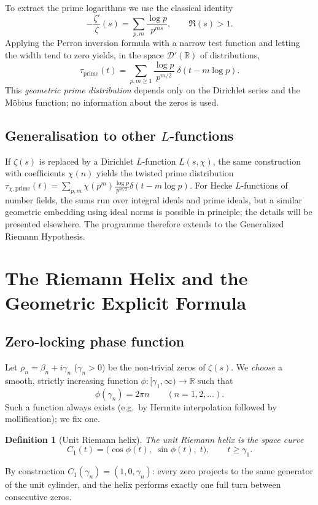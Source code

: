 \documentclass[11pt,a4paper]{article}
\newtheorem{definition}[theorem]{Definition}
\newcommand{\R}{\mathbb{R}}
\newcommand{\dist}{\mathcal{D}'}
\begin{document}
To extract the prime logarithms we use the classical identity
\[
-\frac{\zeta'}{\zeta}(s) = \sum_{p,m} \frac{\log p}{p^{m s}}, \qquad \Re(s)>1 .
\]
Applying the Perron inversion formula with a narrow test function and letting the width tend to zero yields, in the space \(\dist(\R)\) of distributions,
\begin{equation}\label{prime_dist}
\tau_{\text{prime}}(t) = \sum_{p,m\ge 1} \frac{\log p}{p^{m/2}} \;\delta(t - m\log p).
\end{equation}
This \emph{geometric prime distribution} depends only on the Dirichlet series and the M\"obius function; no information about the zeros is used.

\subsection{Generalisation to other \(L\)-functions}
If \(\zeta(s)\) is replaced by a Dirichlet \(L\)-function \(L(s,\chi)\), the same construction with coefficients \(\chi(n)\) yields the twisted prime distribution \(\tau_{\chi,\text{prime}}(t) = \sum_{p,m} \chi(p^m)\frac{\log p}{p^{m/2}}\delta(t-m\log p)\).  For Hecke \(L\)-functions of number fields, the sums run over integral ideals and prime ideals, but a similar geometric embedding using ideal norms is possible in principle; the details will be presented elsewhere.  The programme therefore extends to the Generalized Riemann Hypothesis.

\section{The Riemann Helix and the Geometric Explicit Formula}\label{sec:helix}

\subsection{Zero‑locking phase function}
Let \(\rho_n = \beta_n + i\gamma_n\) (\(\gamma_n>0\)) be the non‑trivial zeros of \(\zeta(s)\).  We \emph{choose} a smooth, strictly increasing function \(\phi:[\gamma_1,\infty)\to\R\) such that
\[
\phi(\gamma_n) = 2\pi n \qquad (n=1,2,\dots).
\]
Such a function always exists (e.g.\ by Hermite interpolation followed by mollification); we fix one.

\begin{definition}[Unit Riemann helix]
The \emph{unit Riemann helix} is the space curve
\[
C_1(t) = \bigl( \cos\phi(t),\; \sin\phi(t),\; t \bigr), \qquad t \ge \gamma_1 .
\]
\end{definition}
By construction \(C_1(\gamma_n) = (1,0,\gamma_n)\): every zero projects to the same generator of the unit cylinder, and the helix performs exactly one full turn between consecutive zeros.
\end{document}
